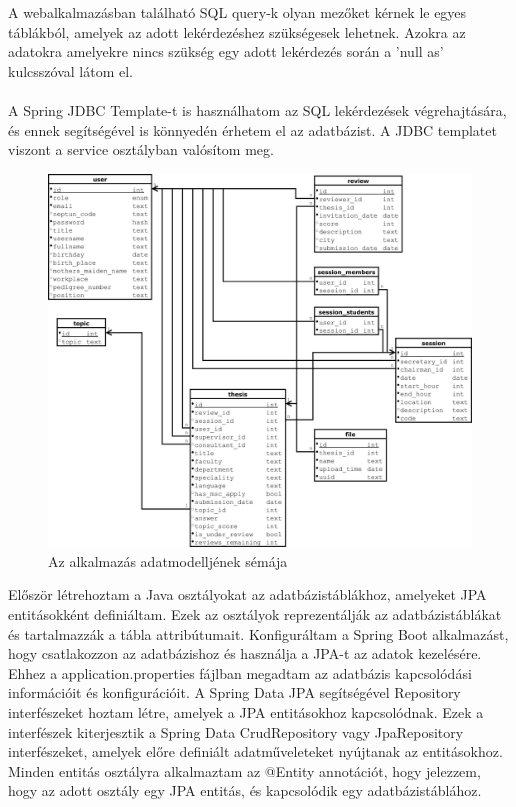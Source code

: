 A webalkalmazásban található SQL query-k olyan mezőket kérnek le egyes táblákból, amelyek az adott lekérdezéshez szükségesek lehetnek. Azokra az adatokra amelyekre nincs szükség egy adott lekérdezés során a 'null as' kulcsszóval látom el.\\
\\
A Spring JDBC Template-t\cite{JdbcTemplate} is használhatom az SQL lekérdezések végrehajtására, és ennek segítségével is könnyedén érhetem el az adatbázist. A JDBC templatet viszont a service osztályban valósítom meg.




\begin{figure}[ht]
	\includegraphics[width=\textwidth]{images/Adatmodell.pdf}
	\caption{Az alkalmazás adatmodelljének sémája}
	\label{fig:datamodel}
\end{figure}


Először létrehoztam a Java\cite{java} osztályokat az adatbázistáblákhoz, amelyeket JPA entitásokként definiáltam. Ezek az osztályok reprezentálják az adatbázistáblákat és tartalmazzák a tábla attribútumait. Konfiguráltam a Spring Boot\cite{spring_boot} alkalmazást, hogy csatlakozzon az adatbázishoz és használja a JPA-t az adatok kezelésére. Ehhez a application.properties fájlban megadtam az adatbázis kapcsolódási információit és konfigurációit. A Spring Data JPA segítségével Repository interfészeket hoztam létre, amelyek a JPA entitásokhoz kapcsolódnak. Ezek a interfészek kiterjesztik a Spring Data CrudRepository vagy JpaRepository interfészeket, amelyek előre definiált adatműveleteket nyújtanak az entitásokhoz. Minden entitás osztályra alkalmaztam az @Entity annotációt, hogy jelezzem, hogy az adott osztály egy JPA entitás, és kapcsolódik egy adatbázistáblához.


